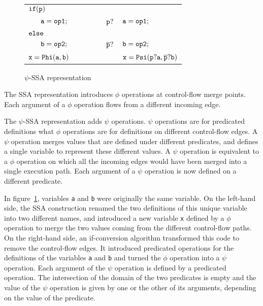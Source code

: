\begin{figure}
\begin{center}
\footnotesize
\begin{tabular}{llll}
${\tt if (p)}$        & & &\\
${\tt\ \ \ \ \ a = op1;}$ & \ \ \ \ \  & ${\tt p?}$ & ${\tt a = op1;}$ \\
${\tt else}$          & & & \\
${\tt\ \ \ \ \     b = op2;}$ & \ \ \ \ \  & ${\tt \overline{p}?}$ & ${\tt b = op2;}$ \\
${\tt x = Phi(a, b)}$ & & & ${\tt x = Psi(p?a, \overline{p}?b)}$ \\
\end{tabular}
\caption{$\psi$-SSA representation}
\label{fig:op_pred}
\end{center}
\end{figure}

The SSA representation introduces $\phi$ operations at control-flow
merge points. Each argument of a $\phi$ operation flows from a
different incoming edge.

The $\psi$-SSA representation adds $\psi$ operations. $\psi$
operations are for predicated definitions what $\phi$ operations are
for definitions on different control-flow edges. A $\psi$ operation
merges values that are defined under different predicates, and defines
a single variable to represent these different values. A $\psi$
operation is equivalent to a $\phi$ operation on which all the
incoming edges would have been merged into a single execution
path. Each argument of a $\psi$ operation is now defined on a
different predicate.

In figure~\ref{fig:op_pred}, variables {\tt a} and {\tt b} were
originally the same variable. On the left-hand side, the SSA
construction renamed the two definitions of this unique variable into
two different names, and introduced a new variable {\tt x} defined by
a $\phi$ operation to merge the two values coming from the different
control-flow paths. On the right-hand side, an if-conversion algorithm
transformed this code to remove the control-flow edges. It introduced
predicated operations for the definitions of the variables {\tt a} and
{\tt b} and turned the $\phi$ operation into a $\psi$ operation. Each
argument of the $\psi$ operation is defined by a predicated
operation. The intersection of the domain of the two predicates is
empty and the value of the $\psi$ operation is given by one or the
other of its arguments, depending on the value of the predicate.

